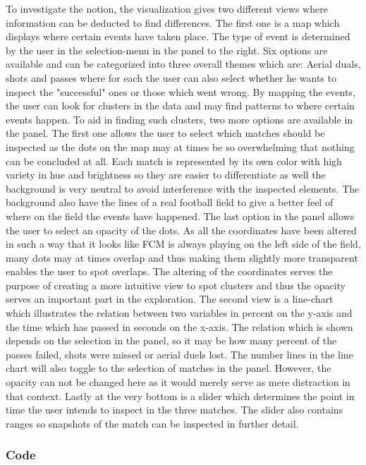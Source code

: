 \documentclass[Report.tex]{subfiles}
\begin{document}
To investigate the notion, the visualization gives two different views where information can be deducted to find differences. The first one is a map which displays where certain events have taken place. The type of event is determined by the user in the selection-menu in the panel to the right. Six options are available and can be categorized into three overall themes which are: Aerial duals, shots and passes where for each the user can also select whether he wants to inspect the "successful" ones or those which went wrong. By mapping the events, the user can look for clusters in the data and may find patterns to where certain events happen. To aid in finding such clusters, two more options are available in the panel. The first one allows the user to select which matches should be inspected as the dots on the map may at times be so overwhelming that nothing can be concluded at all. Each match is represented by its own color with high variety in hue and brightness so they are easier to differentiate as well the background is very neutral to avoid interference with the inspected elements. The background also have the lines of a real football field to give a better feel of where on the field the events have happened. The last option in the panel allows the user to select an opacity of the dots. As all the coordinates have been altered in such a way that it looks like FCM is always playing on the left side of the field, many dots may at times overlap and thus making them slightly more transparent enables the user to spot overlaps. The altering of the coordinates serves the purpose of creating a more intuitive view to spot clusters and thus the opacity serves an important part in the exploration. The second view is a line-chart which illustrates the relation between two variables in percent on the y-axis and the time which has passed in seconds on the x-axis. The relation which is shown depends on the selection in the panel, so it may be how many percent of the passes failed, shots were missed or aerial duels lost. The number lines in the line chart will also toggle to the selection of matches in the panel. However, the opacity can not be changed here as it would merely serve as mere distraction in that context. Lastly at the very bottom is a slider which determines the point in time the user intends to inspect in the three matches. The slider also contains ranges so snapshots of the match can be inspected in further detail.
\subsubsection{Code}
\end{document}
